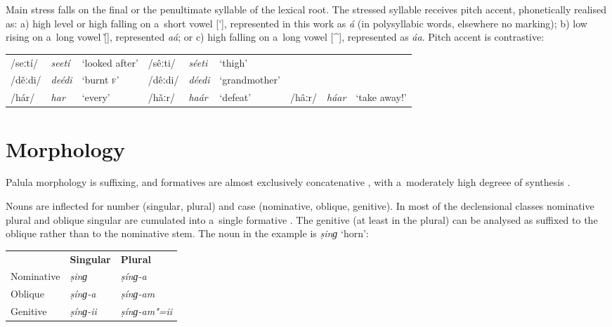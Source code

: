 Main stress falls on the final or the penultimate syllable of the lexical root. The stressed
syllable receives pitch accent, phonetically realised as: a) high level or high falling on a~short vowel
[\'{}], represented in this work as \textit{á} (in polysyllabic words, elsewhere no marking); b)
low rising on a~long vowel [\v{}], represented \textit{aá}; or c) high falling on a~long vowel [\^{}],
represented as \textit{áa}. Pitch accent is contrastive:


\begin{table}[H]
\begin{tabularx}{\textwidth}{ l l Q l l Q l l Q }
/seːtí/ &
\textit{seetí} &
`looked after' &
/sêːti/ &
\textit{séeti} &
`thigh' &
&
&
\\
/děːdi/ &
\textit{deédi} &
`burnt \textsc{f}' &
/dêːdi/ &
\textit{déedi} &
`grand\-mother' & & &
\\
/hár/ &
\textit{har} &
`every' &
/hǎːr/ &
\textit{haár} &
`defeat' &
/hâːr/ &
\textit{háar} &
`take away!' \\
\end{tabularx}
\end{table}


\section{Morphology}
\label{sec:2-2}

Palula morphology is suffixing, and formatives are almost exclusively concatenative \citep[86--9]{bickelnichols2005a}, with a~moderately high degreee of synthesis \citep[94--97]{bickelnichols2005c}. 


Nouns are inflected for number (singular, plural) and case (nominative, oblique, genitive). In most of the declensional classes nominative plural and oblique singular are cumulated into a~single formative \citep[90--93]{bickelnichols2005b}. The genitive (at least in the plural) can be analysed as suffixed to the oblique rather than to the nominative stem. The noun in the example is \textit{ṣinɡ} `horn':


\begin{table}[H]
\begin{tabular}{ l l l }
&
\textbf{Singular} &
\textbf{Plural} \\
Nominative &
\textit{ṣinɡ} &
\textit{ṣínɡ-a} \\
Oblique &
\textit{ṣínɡ-a} &
\textit{ṣínɡ-am} \\
Genitive &
\textit{ṣínɡ-ii} &
\textit{ṣínɡ-am"=ii} \\
\end{tabular}
\end{table}



